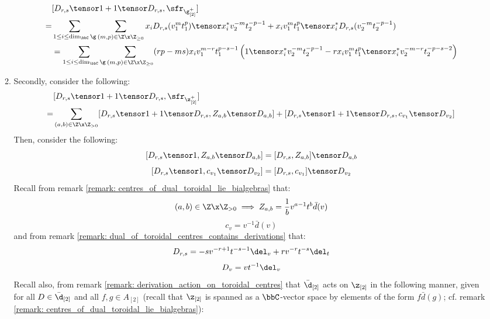 \begin{enumerate}
\begin{enumerate}
$$\begin{aligned}
                                        & [D_{r, s} \tensor 1 + 1 \tensor D_{r, s}, \sfr_{\g_{[2]}^+}]
                                        \\
                                        = & \sum_{1 \leq i \leq \dim_{\bbC} \g} \sum_{(m, p) \in \Z \x \Z_{\geq 0}} x_i D_{r, s}(v_1^m t_1^p) \tensor x_i^* v_2^{-m} t_2^{-p - 1} + x_i v_1^m t_1^p \tensor x_i^* D_{r, s}(v_2^{-m} t_2^{-p - 1})
                                        \\
                                        & = \sum_{1 \leq i \leq \dim_{\bbC} \g} \sum_{(m, p) \in \Z \x \Z_{\geq 0}} (rp - ms) x_i v_1^{m - r} t_1^{p - s - 1} \left( 1 \tensor x_i^* v_2^{-m} t_2^{-p - 1} - r x_i v_1^m t_1^p \tensor x_i^* v_2^{-m - r} t_2^{-p - s - 2} \right)
                                    \end{aligned}
                                $$
                            \item Secondly, consider the following:
                                $$
                                    \begin{aligned}
                                        & [D_{r, s} \tensor 1 + 1 \tensor D_{r, s}, \sfr_{\z_{[2]}^+}]
                                        \\
                                        = & \sum_{(a, b) \in \Z \x \Z_{> 0}} [D_{r, s} \tensor 1 + 1 \tensor D_{r, s}, Z_{a, b} \tensor D_{a, b}] + [D_{r, s} \tensor 1 + 1 \tensor D_{r, s}, c_{v_1} \tensor D_{v_2}]
                                    \end{aligned}
                                $$
                            Then, consider the following:
                                $$[D_{r, s} \tensor 1, Z_{a, b} \tensor D_{a, b}] = [D_{r, s}, Z_{a, b}] \tensor D_{a, b}$$
                                $$[D_{r, s} \tensor 1, c_{v_1} \tensor D_{v_2}] = [D_{r, s}, c_{v_1}] \tensor D_{v_2}$$
                            Recall from remark \ref{remark: centres_of_dual_toroidal_lie_bialgebras} that:
                                $$(a, b) \in \Z \x \Z_{> 0} \implies Z_{a, b} = \frac1b v^{a - 1} t^b \bar{d}(v)$$
                                $$c_v = v^{-1} \bar{d}(v)$$
                            and from remark \ref{remark: dual_of_toroidal_centres_contains_derivations} that:
                                $$D_{r, s} = -s v^{-r + 1} t^{-s - 1} \del_v + r v^{-r} t^{-s} \del_t$$
                                $$D_v = v t^{-1} \del_v$$
                            Recall also, from remark \ref{remark: derivation_action_on_toroidal_centres} that $\bar{\d}_{[2]}$ acts on $\z_{[2]}$ in the following manner, given for all $D \in \bar{\d}_{[2]}$ and all $f, g \in A_{[2]}$ (recall that $\z_{[2]}$ is spanned as a $\bbC$-vector space by elements of the form $f \bar{d}(g)$; cf. remark \ref{remark: centres_of_dual_toroidal_lie_bialgebras}):

\end{enumerate}
\end{enumerate}
